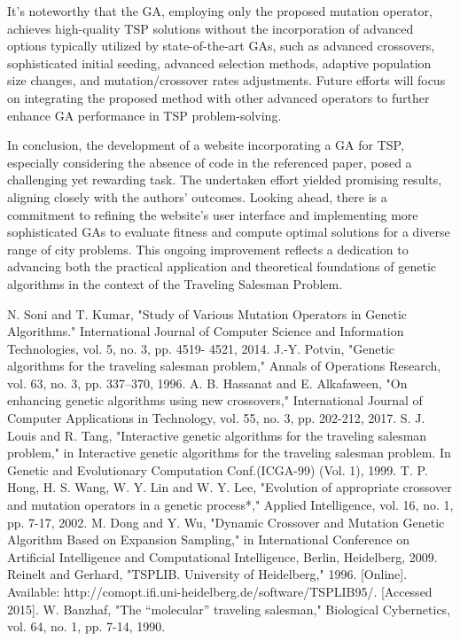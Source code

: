 \documentclass[conference]{IEEEtran}
\begin{document}
It's noteworthy that the GA, employing only the proposed mutation operator, achieves high-quality TSP solutions without the incorporation of advanced options typically utilized by state-of-the-art GAs, such as advanced crossovers, sophisticated initial seeding, advanced selection methods, adaptive population size changes, and mutation/crossover rates adjustments. Future efforts will focus on integrating the proposed method with other advanced operators to further enhance GA performance in TSP problem-solving.

In conclusion, the development of a website incorporating a GA for TSP, especially considering the absence of code in the referenced paper, posed a challenging yet rewarding task. The undertaken effort yielded promising results, aligning closely with the authors' outcomes. Looking ahead, there is a commitment to refining the website's user interface and implementing more sophisticated GAs to evaluate fitness and compute optimal solutions for a diverse range of city problems. This ongoing improvement reflects a dedication to advancing both the practical application and theoretical foundations of genetic algorithms in the context of the Traveling Salesman Problem.

\begin{thebibliography}{00}
 N. Soni and T. Kumar, "Study of Various Mutation Operators in Genetic Algorithms." International Journal of Computer Science and Information Technologies, vol. 5, no. 3, pp. 4519- 4521, 2014.
 J.-Y. Potvin, "Genetic algorithms for the traveling salesman problem," Annals of Operations Research, vol. 63, no. 3, pp. 337--370, 1996.
 A. B. Hassanat and E. Alkafaween, "On enhancing genetic algorithms using new crossovers," International Journal of Computer Applications in Technology, vol. 55, no. 3, pp. 202-212, 2017.
 S. J. Louis and R. Tang, "Interactive genetic algorithms for the traveling salesman problem," in
Interactive genetic algorithms for the traveling salesman problem. In Genetic and Evolutionary Computation Conf.(ICGA-99) (Vol. 1), 1999. 
 T. P. Hong, H. S. Wang, W. Y. Lin and W. Y. Lee, "Evolution of appropriate crossover and mutation operators in a genetic process*," Applied Intelligence, vol. 16, no. 1, pp. 7-17, 2002.
 M. Dong and Y. Wu, "Dynamic Crossover and Mutation Genetic Algorithm Based on Expansion Sampling," in International Conference on Artificial Intelligence and Computational Intelligence, Berlin, Heidelberg, 2009.
 Reinelt and Gerhard, "TSPLIB. University of Heidelberg," 1996. [Online]. Available: http://comopt.ifi.uni-heidelberg.de/software/TSPLIB95/. [Accessed 2015].
 W. Banzhaf, "The “molecular” traveling salesman," Biological Cybernetics, vol. 64, no. 1, pp. 7-14, 1990.

\end{thebibliography}
\vspace{12pt}
\end{document}
